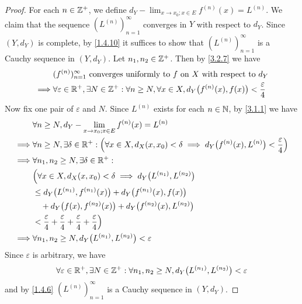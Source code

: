 \begin{proof}
  For each \(n \in \mathbb{Z}^+\), we define \(d_Y - \lim_{x \to x_0 ; x \in E} f^{(n)}(x) = L^{(n)}\).
  We claim that the sequence \((L^{(n)})_{n = 1}^\infty\) converges in \(Y\) with respect to \(d_Y\).
  Since \((Y, d_Y)\) is complete, by \cref{1.4.10} it suffices to show that \((L^{(n)})_{n = 1}^\infty\) is a Cauchy sequence in \((Y, d_Y)\).
  Let \(n_1, n_2 \in \mathbb{Z}^+\).
  Then by \cref{3.2.7} we have
  \begin{align*}
             & (f^{(n)})_{n = 1}^\infty \text{ converges uniformly to } f \text{ on } X \text{ with respect to } d_Y                                        \\
    \implies & \forall \varepsilon \in \mathbb{R}^+, \exists N \in \mathbb{Z}^+ : \forall n \geq N, \forall x \in X, d_Y\big(f^{(n)}(x), f(x)\big) < \dfrac{\varepsilon}{4}
  \end{align*}
  Now fix one pair of \(\varepsilon\) and \(N\).
  Since \(L^{(n)}\) exists for each \(n \in \mathbb{N}\), by \cref{3.1.1} we have
  \begin{align*}
             & \forall n \geq N, d_Y - \lim_{x \to x_0 ; x \in E} f^{(n)}(x) = L^{(n)}                                                                                        \\
    \implies & \forall n \geq N, \exists \delta \in \mathbb{R}^+ : \Big(\forall x \in X, d_X(x, x_0) < \delta \implies d_Y\big(f^{(n)}(x), L^{(n)}\big) < \dfrac{\varepsilon}{4}\Big) \\
    \implies & \forall n_1, n_2 \geq N, \exists \delta \in \mathbb{R}^+ :                                                                                                             \\
             & \Big(\forall x \in X, d_X(x, x_0) < \delta \implies d_Y\big(L^{(n_1)}, L^{(n_2)}\big)                                                                          \\
             & \leq d_Y\big(L^{(n_1)}, f^{(n_1)}(x)\big) + d_Y\big(f^{(n_1)}(x), f(x)\big)                                                                                    \\
             & \quad + d_Y\big(f(x), f^{(n_2)}(x)\big) + d_Y\big(f^{(n_2)}(x), L^{(n_2)}\big)                                                                                 \\
             & < \dfrac{\varepsilon}{4} + \dfrac{\varepsilon}{4} + \dfrac{\varepsilon}{4} + \dfrac{\varepsilon}{4}\Big)                                                       \\
    \implies & \forall n_1, n_2 \geq N, d_Y\big(L^{(n_1)}, L^{(n_2)}\big) < \varepsilon
  \end{align*}
  Since \(\varepsilon\) is arbitrary, we have
  \[
    \forall \varepsilon \in \mathbb{R}^+, \exists N \in \mathbb{Z}^+ : \forall n_1, n_2 \geq N, d_Y\big(L^{(n_1)}, L^{(n_2)}\big) < \varepsilon
  \]
  and by \cref{1.4.6} \((L^{(n)})_{n = 1}^\infty\) is a Cauchy sequence in \((Y, d_Y)\).


\end{proof}

